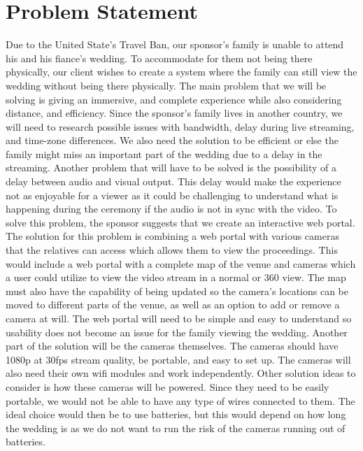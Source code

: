 \documentclass[onecolumn, draftclsnofoot,10pt, compsoc]{IEEEtran}
\begin{document}
\section{Problem Statement}
Due to the United State's Travel Ban, our sponsor's family is unable to attend his and his fiance's wedding.
To accommodate for them not being there physically, our client wishes to create a system where the family can still view the wedding without being there physically.
The main problem that we will be solving is giving an immersive, and complete experience while also considering distance, and efficiency.
Since the sponsor's family lives in another country, we will need to research possible issues with bandwidth, delay during live streaming, and time-zone differences.
We also need the solution to be efficient or else the family might miss an important part of the wedding due to a delay in the streaming.
Another problem that will have to be solved is the possibility of a delay between audio and visual output. 
This delay would make the experience not as enjoyable for a viewer as it could be challenging to understand what is happening during the ceremony if the audio is not in sync with the video.
To solve this problem, the sponsor suggests that we create an interactive web portal.
\newline
\newline
The solution for this problem is combining a web portal with various cameras that the relatives can access which allows them to view the proceedings.
This would include a web portal with a complete map of the venue and cameras which a user could utilize to view the video stream in a normal or 360 view.
The map must also have the capability of being updated so the camera's locations can be moved to different parts of the venue, as well as an option to add or remove a camera at will. 
The web portal will need to be simple and easy to understand so usability does not become an issue for the family viewing the wedding.
Another part of the solution will be the cameras themselves.
The cameras should have 1080p at 30fps stream quality, be portable, and easy to set up.
The cameras will also need their own wifi modules and work independently.
Other solution ideas to consider is how these cameras will be powered.
Since they need to be easily portable, we would not be able to have any type of wires connected to them.
The ideal choice would then be to use batteries, but this would depend on how long the wedding is as we do not want to run the risk of the cameras running out of batteries. 
\end{document}
